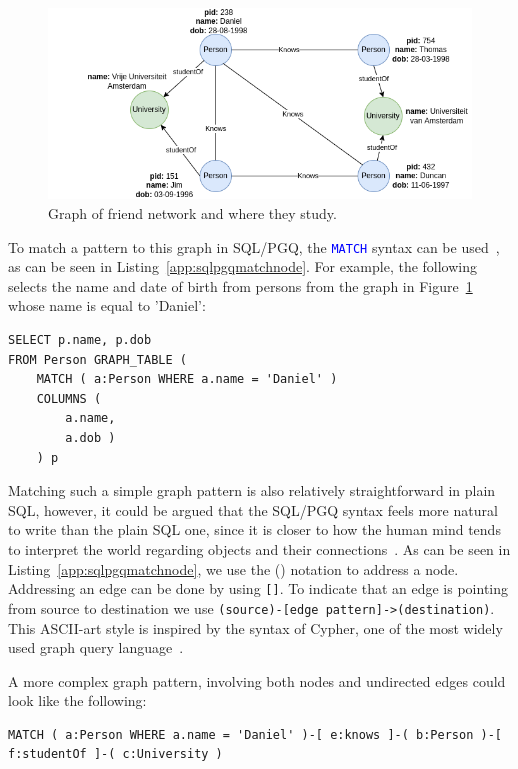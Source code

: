 \begin{figure}
  \includegraphics[width=\linewidth]{figures/friend-graph.png}
  \caption{Graph of friend network and where they study.}
  \label{fig:graph-friend}
\end{figure}


To match a pattern to this graph in SQL/PGQ, the \textcolor{blue}{\texttt{MATCH}} syntax can be used~\cite{Deutsch2021}, as can be seen in Listing~\ref{app:sqlpgqmatchnode}. 
For example, the following selects the name and date of birth from persons from the graph in Figure~\ref{fig:graph-friend} whose name is equal to 'Daniel': 
\begin{lstlisting}[caption=Pattern matching all nodes with the property name Daniel, label=app:sqlpgqmatchnode] 
SELECT p.name, p.dob
FROM Person GRAPH_TABLE (
    MATCH ( a:Person WHERE a.name = 'Daniel' )
    COLUMNS (
        a.name,
        a.dob )
    ) p
\end{lstlisting}

Matching such a simple graph pattern is also relatively straightforward in plain SQL, however, it could be argued that the SQL/PGQ syntax feels more natural to write than the plain SQL one, since it is closer to how the human mind tends to interpret the world regarding objects and their connections~\cite{benkler2008collective}. 
As can be seen in Listing~\ref{app:sqlpgqmatchnode}, we use the () notation to address a node. Addressing an edge can be done by using \texttt{[]}. To indicate that an edge is pointing from source to destination we use \texttt{(source)-[edge pattern]->(destination)}. This ASCII-art style is inspired by the syntax of Cypher, one of the most widely used graph query language~\cite{cypher-popularity}. 

A more complex graph pattern, involving both nodes and undirected edges could look like the following: 
\begin{lstlisting}[caption=Pattern matching using nodes and edges, label=app:sqlpgqmatchnodeedge] 
MATCH ( a:Person WHERE a.name = 'Daniel' )-[ e:knows ]-( b:Person )-[ f:studentOf ]-( c:University ) 
\end{lstlisting}

